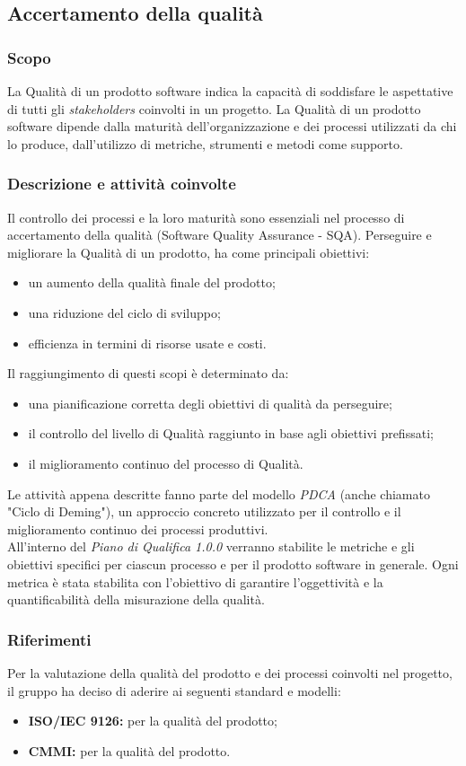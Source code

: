 \subsection{Accertamento della qualit\`a}
\subsubsection{Scopo}
La Qualità di un prodotto software indica la capacità di soddisfare le aspettative di tutti gli \textit{stakeholders\glo} coinvolti in un progetto.
La Qualità di un prodotto software dipende dalla maturità dell'organizzazione e dei processi utilizzati da chi lo produce, dall'utilizzo di metriche, strumenti e metodi come supporto.


\subsubsection{Descrizione e attività coinvolte}
Il controllo dei processi e la loro maturità sono essenziali nel processo di accertamento della qualità (Software Quality Assurance - SQA). 
Perseguire e migliorare la Qualità di un prodotto, ha come principali obiettivi:
\begin{itemize}
	\item un aumento della qualità finale del prodotto;
	\item una riduzione del ciclo di sviluppo;
	\item efficienza in termini di risorse usate e costi.
\end{itemize}
Il raggiungimento di questi scopi è determinato da:
\begin{itemize}
	\item una pianificazione corretta degli obiettivi di qualità da perseguire;
	\item il controllo del livello di Qualità raggiunto in base agli obiettivi prefissati;
	\item il miglioramento continuo del processo di Qualità.
\end{itemize}
Le attività appena descritte fanno parte del modello \textit{PDCA\glo} (anche chiamato "Ciclo di Deming"), un approccio concreto utilizzato per il controllo e il miglioramento continuo dei processi produttivi.\\
All'interno del \textit{Piano di Qualifica 1.0.0\doc} verranno stabilite le metriche e gli obiettivi specifici per ciascun processo e per il prodotto software in generale. Ogni metrica è stata stabilita con l'obiettivo di garantire l'oggettività e la quantificabilità della misurazione della qualità.

\subsubsection{Riferimenti}
Per la valutazione della qualità del prodotto e dei processi coinvolti nel progetto, il gruppo ha deciso di aderire ai seguenti standard e modelli:
\begin{itemize}
	\item \textbf{ISO/IEC 9126:} per la qualità del prodotto;
	\item \textbf{CMMI:} per la qualità del prodotto.
\end{itemize}

